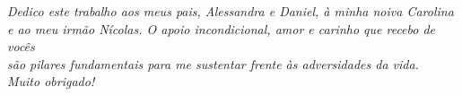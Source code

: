 \begin{dedicatoria}
    \vspace*{\fill}
    \centering
    \noindent
    \textit{ Dedico este trabalho aos meus pais, Alessandra e Daniel, à minha noiva Carolina \\
    e ao meu irmão Nícolas. O apoio incondicional, amor e carinho que recebo de vocês \\ 
    são pilares fundamentais para me sustentar frente às adversidades da vida.\\
    Muito obrigado!} \vspace*{\fill}
\end{dedicatoria}

